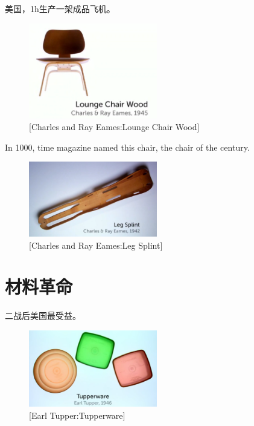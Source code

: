 \documentclass[UTF8]{../../../../RepresentationUniverse}
\begin{document}
美国，1h生产一架成品飞机。

\begin{figure}[h]
    \centering
    \includegraphics[width=0.5\textwidth]{./src/figures/Lounge Chair Wood_2023-04-09_20-27-26.png}
    \caption{[Charles and Ray Eames:Lounge Chair Wood]}
    \label{figure:Lounge Chair Wood}
\end{figure}
In 1000, time magazine named this chair, the chair of the century.


\begin{figure}[h]
    \centering
    \includegraphics[width=0.5\textwidth]{./src/figures/Leg Splint_2023-04-09_20-30-14.png}
    \caption{[Charles and Ray Eames:Leg Splint]}
    \label{figure:Leg Splint}
\end{figure}


\chapter{材料革命}
二战后美国最受益。
\begin{figure}[h]
    \centering
    \includegraphics[width=0.5\textwidth]{./src/figures/Tupperware_2023-04-09_20-37-50.png}
    \caption{[Earl Tupper:Tupperware]}
    \label{figure:Tupperware}
\end{figure}
\end{document}
